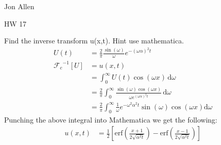 \documentclass{article}
\begin{document}
Jon Allen

HW 17

Find the inverse transform u(x,t). Hint use mathematica.
\begin{align*}
  U(t)&=\frac{2}{\pi }\frac{\sin(\omega )}{\omega }e^{-(\omega \alpha )^2t}\\
  {\mathcal{F}_c}^{-1}[U]&=u(x,t)\\
  &=\int_0^\infty{U(t)\cos(\omega x)\,\mathrm{d}\omega }\\
  &=\frac{2}{\pi }\int_0^\infty{\frac{\sin(\omega )\cos(\omega x)}{\omega e^{(\omega \alpha )^2t}}\,\mathrm{d}\omega }\\
  &=\frac{2}{\pi }\int_0^\infty{\frac{1}{\omega }e^{-\omega^2\alpha^2t}\sin(\omega )\cos(\omega x)\mathrm{d}\omega }
\end{align*}
Punching the above integral into Mathematica we get the following:
\begin{align*}
  u(x,t)&=\frac{1}{2}\left[\text{erf}\left(\frac{x+1}{2\sqrt{\alpha^2t}}\right)-\text{erf}\left(\frac{x-1}{2\sqrt{\alpha^2t}}\right)\right]
\end{align*}
\end{document}
